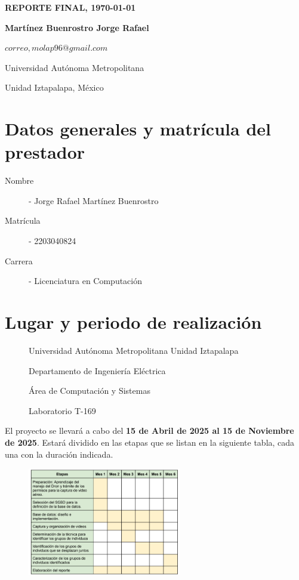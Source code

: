 \documentclass[letterpaper,11pt,twoside]{report}
\date{}
\begin{document}
	\centerline{\bf REPORTE FINAL, \today}
	\centerline{}
	\begin{center}
		\Large{\textsc{}}
	\end{center}
	
	\centerline{}
	\centerline{\textbf{Martínez Buenrostro Jorge Rafael}}
	\centerline{}
	
	\centerline{$correo, molap96@gmail.com$}
	
        \centerline{Universidad Aut\'onoma Metropolitana} 
	\centerline{Unidad Iztapalapa, M\'exico}
	
	\bigskip


	\section{Datos generales y matrícula del prestador}
	\begin{description}
		\item[Nombre] - Jorge Rafael Mart\'inez Buenrostro
		\item[Matr\'icula] - 2203040824
		\item[Carrera] - Licenciatura en Computación
	\end{description}


	\section{Lugar y periodo de realizaci\'on}
	\begin{description}
		\item[] Universidad Aut\'onoma Metropolitana Unidad Iztapalapa
		\item[] Departamento de Ingenier\'ia El\'ectrica
		\item[] \'Area de Computaci\'on y Sistemas
		\item[] Laboratorio T-169
	\end{description}
	\noindent El proyecto se llevar\'a a cabo del \textbf{15 de Abril de 2025 al 15 de Noviembre de 2025}. Estar\'a dividido en las etapas
	que se listan en la siguiente tabla, cada una con la duraci\'on indicada.
	\begin{figure}[H]
		\centering
		\includegraphics[width=0.6\textwidth]{img/gantt.png}
	\end{figure}
\end{document}
